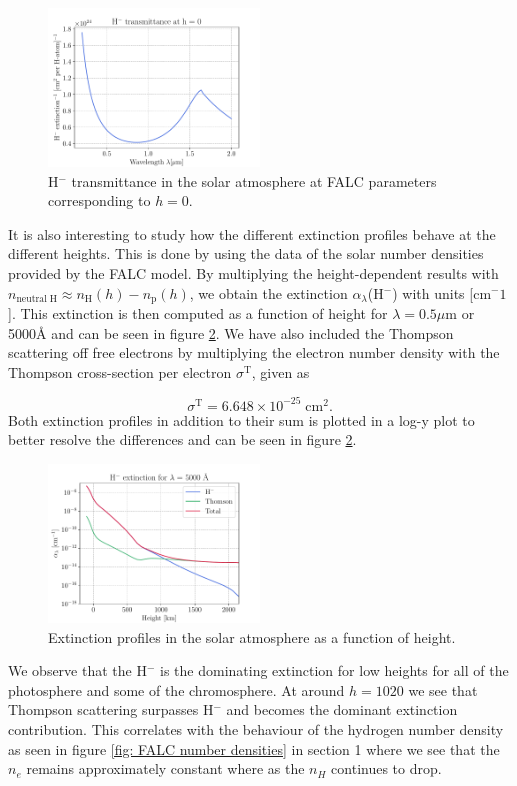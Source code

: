 \documentclass[a4paper,11.5pt,]{article}
\begin{document}
\begin{multicols}{2}
\begin{figure}[H]
    \centering
    \includegraphics[width = 0.5\textwidth]{figures/2.2/extinction_transmittance.pdf}
    \caption{H$^-$ transmittance in the solar atmosphere at FALC parameters corresponding to $h=0$.}
    \label{fig: transmit}
\end{figure}

It is also interesting to study how the different extinction profiles behave at the different heights. This is done by using the data of the solar number densities provided by the FALC model. By multiplying the height-dependent results with $n_\mathrm{neutral\; H} \approx n_\mathrm{H}(h) - n_\mathrm{p}(h)$, we obtain the extinction $\alpha_\lambda$(H$^-$) with units [cm$^-1$]. This extinction is then computed as a function of height for $\lambda = 0.5 \mu$m or 5000Å and can be seen in figure \ref{fig: extinction comp}. We have also included the Thompson scattering off free electrons by multiplying the electron number density with the Thompson cross-section per electron $\sigma^\mathrm{T}$, given as

\begin{equation}
    \sigma^\mathrm{T} = 6.648 \times 10^{-25}\; \mathrm{cm}^2.
\end{equation}
Both extinction profiles in addition to their sum is plotted in a log-y plot to better resolve the differences and can be seen in figure \ref{fig: extinction comp}.
\begin{figure}[H]
    \centering
    \includegraphics[width = 0.5\textwidth]{figures/2.2/extinction_comparison.pdf}
    \caption{Extinction profiles in the solar atmosphere as a function of height.}
    \label{fig: extinction comp}
\end{figure}
 We observe that the H$^-$ is the dominating extinction for low heights for all of the photosphere and some of the chromosphere. At around $h = 1020$ we see that Thompson scattering surpasses H$^-$ and becomes the dominant extinction contribution. This correlates with the behaviour of the hydrogen number density as seen in figure \ref{fig: FALC number densities} in section 1 where we see that the $n_e$ remains approximately constant where as the $n_H$ continues to drop.
 

\end{multicols}
\end{document}
